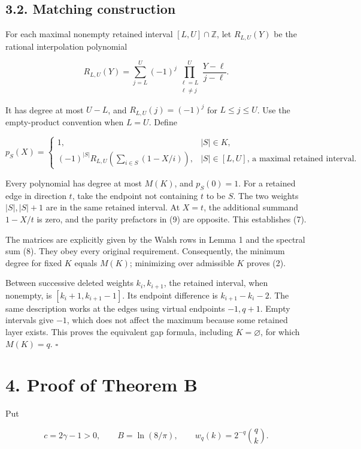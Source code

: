 \documentclass[
  10pt,
]{article}
\begin{document}
\subsection{3.2. Matching construction}\label{matching-construction}

For each maximal nonempty retained interval \([L,U]\cap\mathbb Z\), let \(R_{L,U}(Y)\) be the rational interpolation polynomial

\[
 R_{L,U}(Y)=\sum_{j=L}^U(-1)^j
 \prod_{\substack{\ell=L\\\ell\ne j}}^U\frac{Y-\ell}{j-\ell}.
\]

It has degree at most \(U-L\), and \(R_{L,U}(j)=(-1)^j\) for \(L\le j\le U\). Use the empty-product convention when \(L=U\). Define

\[
 p_S(X)=
 \begin{cases}
 1,& |S|\in K,\\[2mm]
 (-1)^{|S|}R_{L,U}\!\left(\displaystyle\sum_{i\in S}(1-X/i)\right),
 & |S|\in[L,U]\text{, a maximal retained interval}.
 \end{cases}\tag{9}
\]

Every polynomial has degree at most \(M(K)\), and \(p_S(0)=1\). For a retained edge in direction \(t\), take the endpoint not containing \(t\) to be \(S\). The two weights \(|S|,|S|+1\) are in the same retained interval. At \(X=t\), the additional summand \(1-X/t\) is zero, and the parity prefactors in (9) are opposite. This establishes (7).

The matrices are explicitly given by the Walsh rows in Lemma 1 and the spectral sum (8). They obey every original requirement. Consequently, the minimum degree for fixed \(K\) equals \(M(K)\); minimizing over admissible \(K\) proves (2).

Between successive deleted weights \(k_i,k_{i+1}\), the retained interval, when nonempty, is \([k_i+1,k_{i+1}-1]\). Its endpoint difference is \(k_{i+1}-k_i-2\). The same description works at the edges using virtual endpoints \(-1,q+1\). Empty intervals give \(-1\), which does not affect the maximum because some retained layer exists. This proves the equivalent gap formula, including \(K=\varnothing\), for which \(M(K)=q\). \(\square\)

\section{4. Proof of Theorem B}\label{proof-of-theorem-b}

Put

\[
 c=2\gamma-1>0,\qquad B=\ln(8/\pi),\qquad
 w_q(k)=2^{-q}\binom qk.
\]
\end{document}

